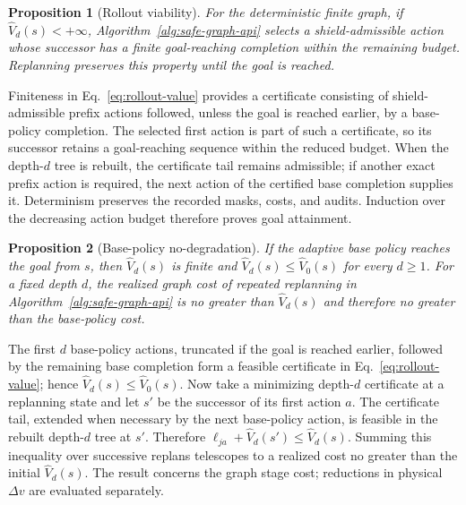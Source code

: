 \documentclass{IEEEtaes}
\newtheorem{proposition}{Proposition}
\theoremstyle{remark}
\theoremstyle{plain}
\begin{document}
\begin{proposition}[Rollout viability]
\label{prop:rollout-viability}
For the deterministic finite graph, if $\widehat V_d(s)<+\infty$, Algorithm~\ref{alg:safe-graph-api} selects a shield-admissible action whose successor has a finite goal-reaching completion within the remaining budget. Replanning preserves this property until the goal is reached.
\end{proposition}

\begin{IEEEproof}
Finiteness in Eq.~\eqref{eq:rollout-value} provides a certificate consisting of shield-admissible prefix actions followed, unless the goal is reached earlier, by a base-policy completion. The selected first action is part of such a certificate, so its successor retains a goal-reaching sequence within the reduced budget. When the depth-$d$ tree is rebuilt, the certificate tail remains admissible; if another exact prefix action is required, the next action of the certified base completion supplies it. Determinism preserves the recorded masks, costs, and audits. Induction over the decreasing action budget therefore proves goal attainment.
\end{IEEEproof}

\begin{proposition}[Base-policy no-degradation]
\label{prop:base-bound}
If the adaptive base policy reaches the goal from $s$, then $\widehat V_d(s)$ is finite and $\widehat V_d(s)\le\widehat V_0(s)$ for every $d\ge1$. For a fixed depth $d$, the realized graph cost of repeated replanning in Algorithm~\ref{alg:safe-graph-api} is no greater than $\widehat V_d(s)$ and therefore no greater than the base-policy cost.
\end{proposition}

\begin{IEEEproof}
The first $d$ base-policy actions, truncated if the goal is reached earlier, followed by the remaining base completion form a feasible certificate in Eq.~\eqref{eq:rollout-value}; hence $\widehat V_d(s)\le\widehat V_0(s)$. Now take a minimizing depth-$d$ certificate at a replanning state and let $s'$ be the successor of its first action $a$. The certificate tail, extended when necessary by the next base-policy action, is feasible in the rebuilt depth-$d$ tree at $s'$. Therefore $\ell_{ja}+\widehat V_d(s')\le\widehat V_d(s)$. Summing this inequality over successive replans telescopes to a realized cost no greater than the initial $\widehat V_d(s)$. The result concerns the graph stage cost; reductions in physical $\Delta v$ are evaluated separately.
\end{IEEEproof}
\end{document}
